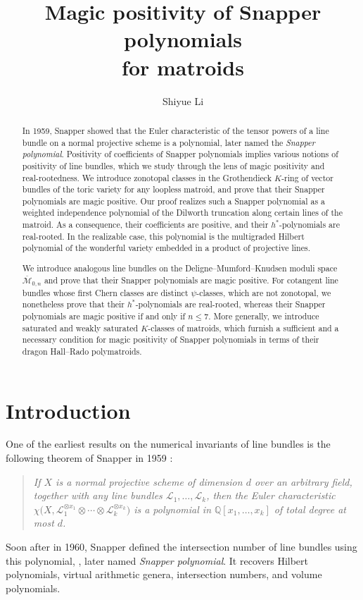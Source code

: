 \documentclass[11pt,a4paper,reqno]{amsart}
\title{Magic positivity of Snapper polynomials \\ for matroids}
\author{Shiyue Li}
\theoremstyle{results}
\theoremstyle{definitions}
\def\Q{\mathbb{Q}}
\newcommand{\cL}{\mathcal{L}}
\begin{document}
\begin{abstract}
  In 1959, Snapper showed that the Euler characteristic of the tensor powers of a line bundle on a normal projective scheme is a polynomial, later named the \emph{Snapper polynomial}. 
  Positivity of coefficients of Snapper polynomials implies various notions of positivity of line bundles, which we study through the lens of magic positivity and real-rootedness. 
  We introduce zonotopal classes in the Grothendieck $K$-ring of vector bundles of the toric variety for any loopless matroid, and
  prove that their Snapper polynomials are magic positive. Our proof realizes such a Snapper polynomial as a weighted independence polynomial of the Dilworth truncation along certain lines of the matroid. As a consequence,
  their coefficients are positive, and their $h^{\ast}$-polynomials are real-rooted. 
  In the realizable case, this polynomial is the multigraded Hilbert polynomial of the wonderful variety embedded in a product of
  projective lines.

  We introduce analogous line bundles on the Deligne--Mumford--Knudsen moduli space $\overline{\mathcal M}_{0,n}$ and prove that their Snapper polynomials are magic positive. 
  For cotangent line bundles whose first Chern classes are distinct $\psi$-classes, which are not zonotopal, we nonetheless prove that their $h^{\ast}$-polynomials are real-rooted, whereas their Snapper polynomials are magic positive if and only if $n\leqslant7$.
  More generally, we introduce saturated and weakly saturated $K$-classes of matroids, which furnish a sufficient and a necessary condition
  for magic positivity of Snapper polynomials in terms of their dragon Hall--Rado polymatroids.
\end{abstract}
\maketitle
\raggedbottom

\setcounter{tocdepth}{1}
\tableofcontents

\section{Introduction}
\label{sec:intro}
One of the earliest results on the numerical invariants of line bundles is the
following theorem of Snapper in 1959 \cite{snapper1959multiples}:
\begin{quote}\itshape
  If $X$ is a normal projective scheme of dimension $d$ over an arbitrary field,
  together with any line bundles $\cL_1, \dots, \cL_k$, then the Euler
  characteristic
  $\chi\big(X, \cL_1^{\otimes x_1} \otimes \cdots \otimes \cL_k^{\otimes x_k}\big)$
  is a polynomial in $\Q[x_1, \dots, x_k]$ of total degree at most $d$.
\end{quote}
Soon after in 1960, Snapper defined the intersection number of line bundles using this polynomial, 
\cite[\S 4]{snapper1960polynomials}, later named \emph{Snapper polynomial}. It recovers Hilbert polynomials, virtual arithmetic
genera, intersection numbers, and volume polynomials. 
\end{document}
